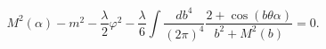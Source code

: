 \begin{equation}
M^{2}(\alpha)-m^{2}%
-\dfrac{\lambda}{2}\varphi^{2}-\frac{\lambda}{6}\int
\frac{db^{4}}{(2\pi)^{4}}  \frac{2+\cos\left(
b\theta\alpha\right)} {b^{2}+M^{2}(b)}=0. \label{gapquation}
\end{equation}

